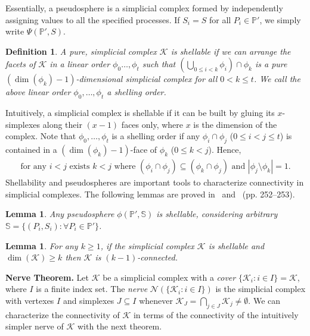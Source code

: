 \documentclass[11pt]{article}
\newcommand{\cK}{\ensuremath{\mathcal{K}}}
\newcommand{\cN}{\ensuremath{\mathcal{N}}}
\newcommand{\bbP}{\ensuremath{\mathbb{P}}}
\newcommand{\bbS}{\ensuremath{\mathbb{S}}}
\newtheorem{definition}[theorem]{Definition}
\newtheorem{lemma}[theorem]{Lemma}
\newcommand{\set}[1]{\{#1\}}
\begin{document}
Essentially,
a pseudosphere
is a simplicial complex formed by independently assigning values to all the specified processes.
If $S_i = S$ for all $P_i \in \bbP'$,
we simply write $\Psi(\bbP', S)$.



\begin{definition}
\label{definition-shellable}
A pure, simplicial complex $\cK$ is \emph{shellable} if we can arrange the facets of $\cK$
in a linear order $\phi_0 \ldots, \phi_t$ such that
$ \left( \bigcup_{0 \le i < k} \phi_i \right) \cap \phi_k $
is a pure $(\dim(\phi_k) - 1)$-dimensional simplicial complex for all $0 < k \le t$.
We call the above linear order $\phi_0, \ldots, \phi_t$ a \emph{shelling order}.
\end{definition}

Intuitively,
a simplicial complex is shellable
if it can be built by gluing its $x$-simplexes along their $(x - 1)$ faces only,
where $x$ is the dimension of the complex.
Note that $\phi_0, \ldots, \phi_t$ is a shelling order
if any $\phi_i \cap \phi_j$ ($0\le i < j \le t$)
is contained in a $(\dim(\phi_k) - 1)$-face of $\phi_k$ ($0\le k < j$).
Hence,
\begin{align}
\textrm{for any } i < j \textrm{ exists } k < j \textrm{ where } (\phi_i \cap \phi_j) \subseteq (\phi_k \cap \phi_j)
\textrm{ and }
|\phi_j \setminus \phi_k| = 1 \mathrm{.}
\end{align}
Shellability and pseudospheres are important tools to
characterize connectivity in simplicial complexes.
The following lemmas are proved
in~\cite{ConcurrentShellable} and~\cite{MauriceBook} (pp. 252--253).

\begin{lemma}
\label{lemma-pseudosphere-shellable}
Any pseudosphere $\phi(\bbP', \bbS)$ is shellable,
considering arbitrary $\bbS = \set{(P_i,S_i): \forall P_i \in \bbP'}$.
\end{lemma}


\begin{lemma}
\label{lemma-shellable-connected}
For any $k \ge 1$,
if the simplicial complex $\cK$ is shellable and $\dim(\cK) \ge k$
then $\cK$ is $(k - 1)$-connected.
\end{lemma}




\textbf{Nerve Theorem.} 
Let $\cK$ be a simplicial complex with a \emph{cover}
$\set{\cK_i: i \in I} = \cK$,
where $I$ is a finite index set.
The \emph{nerve} $\cN(\set{\cK_i: i \in I})$ is the simplicial complex with vertexes $I$
and simplexes $J \subseteq I$ whenever $ \cK_J = \bigcap_{j \in J} \cK_j \ne \emptyset \mathrm{.} $
We can characterize the connectivity of $\cK$ in terms of the connectivity of
the intuitively simpler nerve of $\cK$
with the next theorem.
\end{document}
